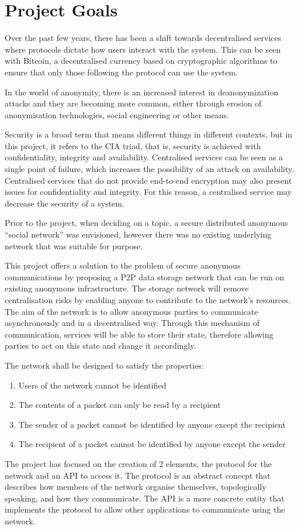 \section{Project Goals}
	Over the past few years, there has been a shift towards decentralised services where protocols dictate how users interact with the system. This can be seen with Bitcoin, a decentralised currency based on cryptographic algorithms  to ensure that only those following the protocol can use the system.
	
	
	In the world of anonymity, there is an increased interest in deanonymization attacks and they are becoming more common, either through erosion of anonymisation technologies, social engineering or other means.
	
	Security is a broad term that means different things in different contexts, but in this project, it refers to the CIA triad, that is, security is achieved with confidentiality, integrity and availability. Centralised services can be seen as a single point of failure, which increases the possibility of an attack on availability. Centralised services that do not provide end-to-end encryption may also present issues for confidentiality and integrity. For this reason, a centralised service may decrease the security of a system.
	
	Prior to the project, when deciding on a topic, a secure distributed anonymous ``social network'' was envisioned, however there was no existing underlying network that was suitable for purpose.
	
	This project offers a solution to the problem of secure anonymous communications by proposing a P2P data storage network that can be run on existing anonymous infrastructure. The storage network will remove centralisation risks by enabling anyone to contribute to the network's resources. The aim of the network is to allow anonymous parties to communicate asynchronously and in a decentralised way. Through this mechanism of communication, services will be able to store their state, therefore allowing parties to act on this state and change it accordingly.
	
	The network shall be designed to satisfy the properties:
	\begin{enumerate}
		\item Users of the network cannot be identified
		\item The contents of a packet can only be read by a recipient
		\item The sender of a packet cannot be identified by anyone except the recipient
		\item The recipient of a packet cannot be identified by anyone except the sender
	\end{enumerate}
	
	The project has focused on the creation of 2 elements, the protocol for the network and an API to access it. The protocol is an abstract concept that describes how members of the network organise themselves, topologically speaking, and how they communicate. The API is a more concrete entity that implements the protocol to allow other applications to communicate using the network.